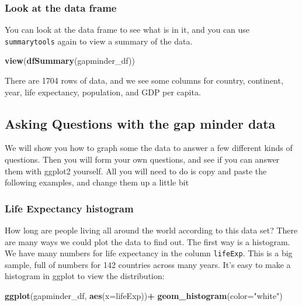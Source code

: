 \documentclass[]{book}
\newenvironment{Shaded}{\begin{snugshade}}{\end{snugshade}}
\newcommand{\KeywordTok}[1]{\textcolor[rgb]{0.13,0.29,0.53}{\textbf{#1}}}
\newcommand{\DataTypeTok}[1]{\textcolor[rgb]{0.13,0.29,0.53}{#1}}
\newcommand{\StringTok}[1]{\textcolor[rgb]{0.31,0.60,0.02}{#1}}
\newcommand{\OperatorTok}[1]{\textcolor[rgb]{0.81,0.36,0.00}{\textbf{#1}}}
\newcommand{\NormalTok}[1]{#1}
\begin{document}
\subsubsection{Look at the data frame}\label{look-at-the-data-frame}

You can look at the data frame to see what is in it, and you can use
\texttt{summarytools} again to view a summary of the data.

\begin{Shaded}
\begin{Highlighting}[]
\KeywordTok{view}\NormalTok{(}\KeywordTok{dfSummary}\NormalTok{(gapminder_df))}
\end{Highlighting}
\end{Shaded}

There are 1704 rows of data, and we see some columns for country,
continent, year, life expectancy, population, and GDP per capita.

\subsection{Asking Questions with the gap minder
data}\label{asking-questions-with-the-gap-minder-data}

We will show you how to graph some the data to answer a few different
kinds of questions. Then you will form your own questions, and see if
you can answer them with ggplot2 yourself. All you will need to do is
copy and paste the following examples, and change them up a little bit

\subsubsection{Life Expectancy
histogram}\label{life-expectancy-histogram}

How long are people living all around the world according to this data
set? There are many ways we could plot the data to find out. The first
way is a histogram. We have many numbers for life expectancy in the
column \texttt{lifeExp}. This is a big sample, full of numbers for 142
countries across many years. It's easy to make a histogram in ggplot to
view the distribution:

\begin{Shaded}
\begin{Highlighting}[]
\KeywordTok{ggplot}\NormalTok{(gapminder_df, }\KeywordTok{aes}\NormalTok{(}\DataTypeTok{x=}\NormalTok{lifeExp))}\OperatorTok{+}
\StringTok{  }\KeywordTok{geom_histogram}\NormalTok{(}\DataTypeTok{color=}\StringTok{"white"}\NormalTok{)}
\end{Highlighting}
\end{Shaded}
\end{document}
